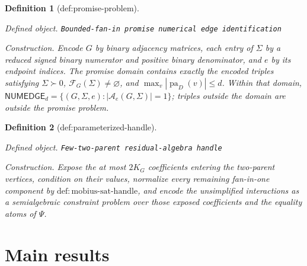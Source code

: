 \documentclass{article}
\newtheorem{definition}{Definition}
\begin{document}
\begin{definition}[def:promise-problem]\label{def:promise-problem}
\par\smallskip\noindent\emph{Defined object.} \texttt{Bounded-\allowbreak{}fan-\allowbreak{}in promise numerical edge identification}
\par\smallskip\noindent\emph{Construction.} Encode \(G\) by binary adjacency matrices, each entry of \(\Sigma\) by a reduced signed binary numerator and positive binary denominator, and \(e\) by its endpoint indices. The promise domain contains exactly the encoded triples satisfying \(\Sigma\succ0\), \(\mathcal F_G(\Sigma)\ne\varnothing\), and \(\max_v|\operatorname{pa}_D(v)|\le d\). Within that domain, \(\mathsf{NUMEDGE}_d=\{(G,\Sigma,e):|\mathcal A_e(G,\Sigma)|=1\}\); triples outside the domain are outside the promise problem.
\end{definition}

\begin{definition}[def:parameterized-handle]\label{def:parameterized-handle}
\par\smallskip\noindent\emph{Defined object.} \texttt{Few-\allowbreak{}two-\allowbreak{}parent residual-\allowbreak{}algebra handle}
\par\smallskip\noindent\emph{Construction.} Expose the at most \(2K_G\) coefficients entering the two-parent vertices, condition on their values, normalize every remaining fan-in-one component by \(\mathrm{def:mobius\mbox{-}sat\mbox{-}handle}\), and encode the unsimplified interactions as a semialgebraic constraint problem over those exposed coefficients and the equality atoms of \(\Psi\).
\end{definition}

\section{Main results}
\end{document}
